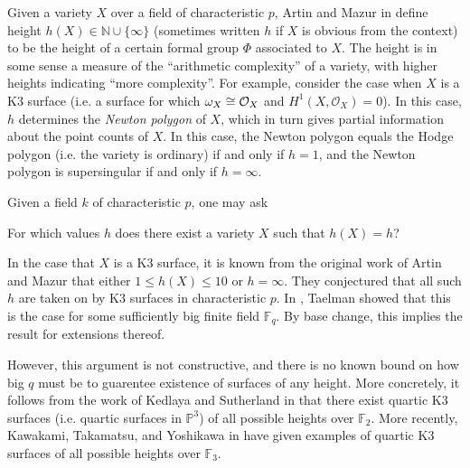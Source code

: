 Given a variety \(X\) over a field of characteristic \(p\),
Artin and Mazur in \cite{artin-mazur-1977-height}
define height \(h(X) \in \mathbb{N} \cup \{\infty\}\) 
(sometimes written \(h\) if \(X\) is obvious from the context)
to be the height 
of a certain formal group \(\Phi\) associated to \(X\).
The height is in some sense a measure of the
``arithmetic complexity'' of a variety,
with higher heights indicating ``more complexity''.
For example, consider the case when \(X\) is a 
K3 surface (i.e. a surface for which \(\omega_{X} \cong \mathcal{O}_{X} \) 
and \(H^{1}(X,\mathcal{O}_{X} ) = 0\)).
In this case, \(h\) determines the \textit{Newton polygon}
of \(X\), which in turn gives partial information about the 
point counts of \(X\).
In this case, the Newton polygon equals the Hodge polygon
(i.e. the variety is ordinary) if and only if \(h=1\),
and the Newton polygon is supersingular if and only if 
\(h = \infty\).

Given a field \(k\) of characteristic \(p\), one may ask

\begin{quest}
    For which values \(h\) does there exist a variety
    \(X\) such that \(h(X) = h\)?
\end{quest}

In the case that \(X\) is a K3 surface, it is known from the 
original work of Artin and Mazur
that either \(1 \leq h(X) \leq 10\) or \(h = \infty\).
They conjectured that all such $h$ are taken on by K3 surfaces
in characteristic $p$.
In \cite{taelman-2016-k3-given-l-function}, 
Taelman showed that
this is the case
for some sufficiently big finite field \(\mathbb{F}_{q}\). 
By base change, this implies the result for extensions
thereof.

However, this argument is not constructive,
and there is no known bound on how big \(q\) must be to guarentee
existence of surfaces of any height.
More concretely, it follows from the work of
Kedlaya and Sutherland in 
\cite{kedlaya-sutherland-2016-census-k3-f2}
that there exist quartic K3 surfaces
(i.e. quartic surfaces in \(\mathbb{P}^{3}\))
of all possible heights over \(\mathbb{F}_{2}\).
More recently,
Kawakami, Takamatsu, and Yoshikawa in \cite{kty-2022-fedder}
have given examples of quartic K3 surfaces
of all possible heights over \(\mathbb{F}_{3}\).

